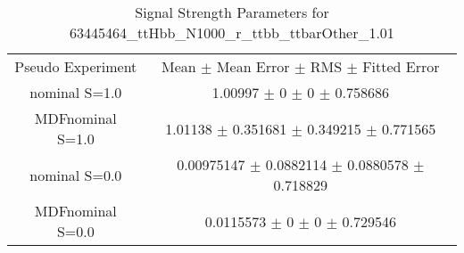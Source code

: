 \begin{table}
\centering
\caption{Signal Strength Parameters for 63445464\_ttHbb\_N1000\_r\_ttbb\_ttbarOther\_1.01}
\begin{tabular}{cc}
\toprule
Pseudo Experiment & Mean $\pm$ Mean Error $\pm$ RMS $\pm$ Fitted Error\\
nominal S=1.0 & \num{1.00997} $\pm$ \num{0} $\pm$ \num{0} $\pm$ \num{0.758686}\\
MDFnominal S=1.0 & \num{1.01138} $\pm$ \num{0.351681} $\pm$ \num{0.349215} $\pm$ \num{0.771565}\\
nominal S=0.0 & \num{0.00975147} $\pm$ \num{0.0882114} $\pm$ \num{0.0880578} $\pm$ \num{0.718829}\\
MDFnominal S=0.0 & \num{0.0115573} $\pm$ \num{0} $\pm$ \num{0} $\pm$ \num{0.729546}\\
\bottomrule
\end{tabular}
\end{table}